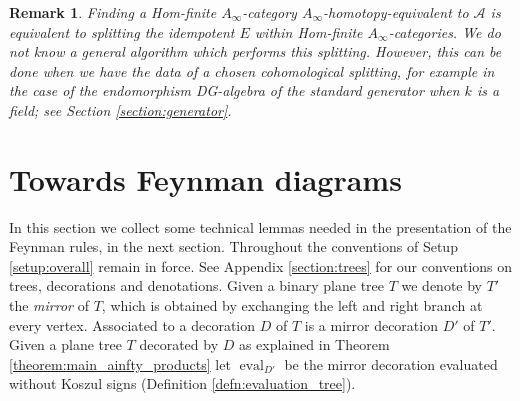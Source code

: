 \documentclass[english,letter paper,12pt,leqno]{article}
\theoremstyle{example}
\newtheorem{remark}[theorem]{Remark}
\numberwithin{equation}{section}
\def\AA{\mathcal{A}}
\begin{document}
\begin{remark} Finding a Hom-finite $A_\infty$-category $A_\infty$-homotopy-equivalent to $\AA$ is equivalent to \emph{splitting} the idempotent $E$ within Hom-finite $A_\infty$-categories. We do not know a general algorithm which performs this splitting. However, this can be done when we have the data of a chosen cohomological splitting, for example in the case of the endomorphism DG-algebra of the standard generator when $k$ is a field; see Section \ref{section:generator}.
\end{remark}

\section{Towards Feynman diagrams}\label{section:towards}

In this section we collect some technical lemmas needed in the presentation of the Feynman rules, in the next section. Throughout the conventions of Setup \ref{setup:overall} remain in force. See Appendix \ref{section:trees} for our conventions on trees, decorations and denotations. Given a binary plane tree $T$ we denote by $T'$ the \emph{mirror} of $T$, which is obtained by exchanging the left and right branch at every vertex. Associated to a decoration $D$ of $T$ is a mirror decoration $D'$ of $T'$. Given a plane tree $T$ decorated by $D$ as explained in Theorem \ref{theorem:main_ainfty_products} let $\operatorname{eval}_{D'}$ be the mirror decoration evaluated without Koszul signs (Definition \ref{defn:evaluation_tree}).
\end{document}
